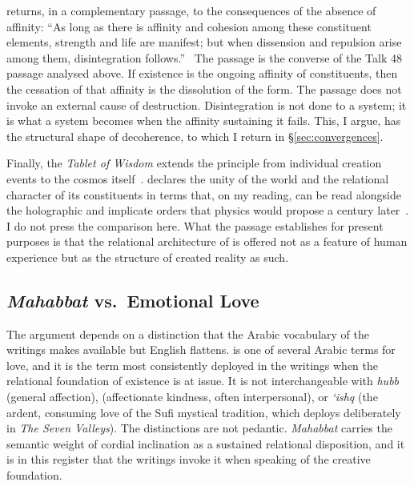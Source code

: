 \AbdulBaha returns, in a complementary passage, to the consequences of
the absence of affinity:
``As long as there is affinity and cohesion among these constituent
elements, strength and life are manifest; but when dissension and
repulsion arise among them, disintegration follows.''~\citep[Talk 41]{PUP}
The passage is the converse of the Talk 48 passage analysed above.
If existence is the ongoing affinity of constituents, then the cessation of
that affinity is the dissolution of the form.
The passage does not invoke an external cause of destruction.
Disintegration is not done to a system; it is what a system becomes when the
affinity sustaining it fails.
This, I argue, has the structural shape of decoherence, to which I return in
\S\ref{sec:convergences}.

Finally, the \textit{Tablet of Wisdom} extends the principle from individual
creation events to the cosmos itself~\citep{TabletsBahaullah}.
\Bahaullah declares the unity of the world and the relational character of
its constituents in terms that, on my reading, can be read alongside the holographic and implicate
orders that physics would propose a century later~\citep{Bohm1980,Susskind1995}.
I do not press the comparison here.
What the passage establishes for present purposes is that the relational
architecture of \mahabbat is offered not as a feature of human experience but
as the structure of created reality as such.

\subsection{\textit{Mahabbat} vs.\ Emotional Love}

The argument depends on a distinction that the Arabic vocabulary of the
\bahai writings makes available but English flattens.
\mahabbat is one of several Arabic terms for love, and it is the term most
consistently deployed in the writings when the relational foundation of
existence is at issue.
It is not interchangeable with \textit{hubb} (general affection),
\mawaddat (affectionate kindness, often interpersonal), or
\textit{\textquoteleft ishq} (the ardent, consuming love of the Sufi mystical
tradition, which \Bahaullah deploys deliberately in \textit{The Seven Valleys}).
The distinctions are not pedantic.
\textit{Mahabbat} carries the semantic weight of cordial inclination as a
sustained relational disposition, and it is in this register that the
writings invoke it when speaking of the creative foundation.

